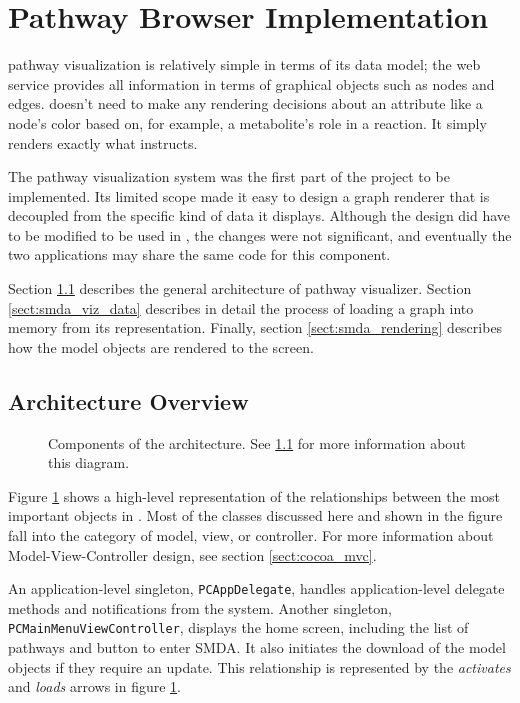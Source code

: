 \section{Pathway Browser Implementation}
\label{sect:maw_implementation}

\mawappp pathway visualization is relatively simple in terms of its data model;
the \pathcasemaw web service provides all information in terms of graphical
objects such as nodes and edges. \mawapp doesn't need to make any rendering
decisions about an attribute like a node's color based on, for example, a
metabolite's role in a reaction. It simply renders exactly what \pathcasemaw
instructs.

The pathway visualization system was the first part of the project to be
implemented. Its limited scope made it easy to design a graph renderer that is
decoupled from the specific kind of data it displays. Although the design did
have to be modified to be used in \keggapp, the changes were not significant,
and eventually the two applications may share the same code for this component.

Section \ref{sect:smda_arch_overview} describes the general architecture of
\mawappp pathway visualizer. Section \ref{sect:smda_viz_data} describes in
detail the process of loading a graph into memory from its \pathcasemaw
representation. Finally, section \ref{sect:smda_rendering} describes how the
model objects are rendered to the screen.

\subsection{Architecture Overview}
\label{sect:smda_arch_overview}

\begin{figure}[p]
    \caption{\label{fig:maw_components} Components of the architecture. See
    \ref{sect:smda_arch_overview} for more information about this diagram.}
\end{figure}

Figure \ref{fig:maw_components} shows a high-level representation of the
relationships between the most important objects in \mawapp. Most of the classes
discussed here and shown in the figure fall into the category of model, view, or
controller. For more information about Model-View-Controller design, see section
\ref{sect:cocoa_mvc}.

An application-level singleton, \texttt{PCAppDelegate}, handles
application-level delegate methods and notifications from the system. Another
singleton, \texttt{PCMainMenuViewController}, displays the home screen,
including the list of pathways and button to enter SMDA. It also initiates the
download of the model objects if they require an update. This relationship is
represented by the \emph{activates} and \emph{loads} arrows in figure
\ref{fig:maw_components}.

